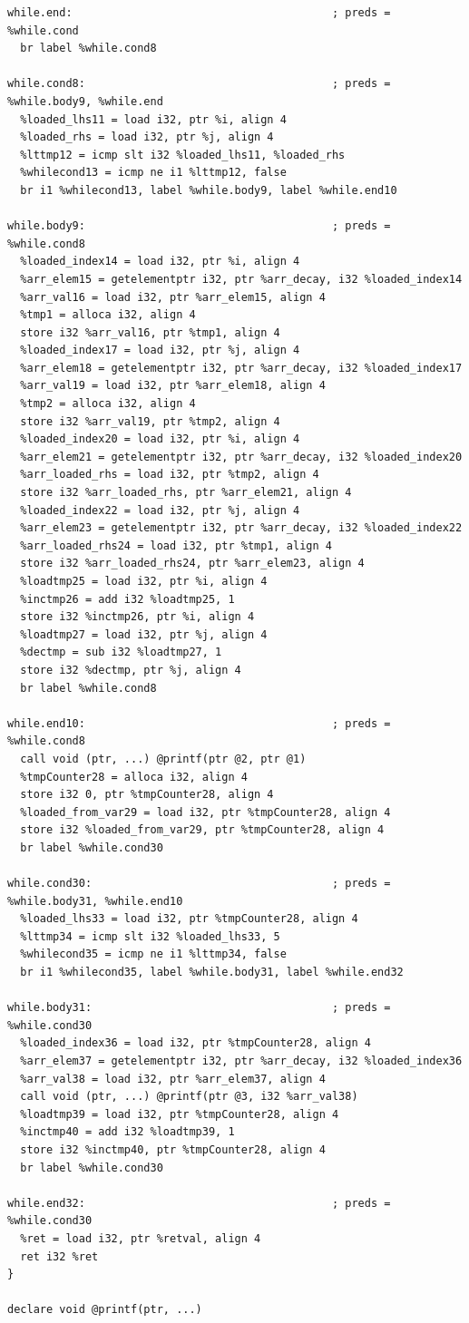 \begin{lstlisting}
while.end:                                        ; preds = %while.cond
  br label %while.cond8

while.cond8:                                      ; preds = %while.body9, %while.end
  %loaded_lhs11 = load i32, ptr %i, align 4
  %loaded_rhs = load i32, ptr %j, align 4
  %lttmp12 = icmp slt i32 %loaded_lhs11, %loaded_rhs
  %whilecond13 = icmp ne i1 %lttmp12, false
  br i1 %whilecond13, label %while.body9, label %while.end10

while.body9:                                      ; preds = %while.cond8
  %loaded_index14 = load i32, ptr %i, align 4
  %arr_elem15 = getelementptr i32, ptr %arr_decay, i32 %loaded_index14
  %arr_val16 = load i32, ptr %arr_elem15, align 4
  %tmp1 = alloca i32, align 4
  store i32 %arr_val16, ptr %tmp1, align 4
  %loaded_index17 = load i32, ptr %j, align 4
  %arr_elem18 = getelementptr i32, ptr %arr_decay, i32 %loaded_index17
  %arr_val19 = load i32, ptr %arr_elem18, align 4
  %tmp2 = alloca i32, align 4
  store i32 %arr_val19, ptr %tmp2, align 4
  %loaded_index20 = load i32, ptr %i, align 4
  %arr_elem21 = getelementptr i32, ptr %arr_decay, i32 %loaded_index20
  %arr_loaded_rhs = load i32, ptr %tmp2, align 4
  store i32 %arr_loaded_rhs, ptr %arr_elem21, align 4
  %loaded_index22 = load i32, ptr %j, align 4
  %arr_elem23 = getelementptr i32, ptr %arr_decay, i32 %loaded_index22
  %arr_loaded_rhs24 = load i32, ptr %tmp1, align 4
  store i32 %arr_loaded_rhs24, ptr %arr_elem23, align 4
  %loadtmp25 = load i32, ptr %i, align 4
  %inctmp26 = add i32 %loadtmp25, 1
  store i32 %inctmp26, ptr %i, align 4
  %loadtmp27 = load i32, ptr %j, align 4
  %dectmp = sub i32 %loadtmp27, 1
  store i32 %dectmp, ptr %j, align 4
  br label %while.cond8

while.end10:                                      ; preds = %while.cond8
  call void (ptr, ...) @printf(ptr @2, ptr @1)
  %tmpCounter28 = alloca i32, align 4
  store i32 0, ptr %tmpCounter28, align 4
  %loaded_from_var29 = load i32, ptr %tmpCounter28, align 4
  store i32 %loaded_from_var29, ptr %tmpCounter28, align 4
  br label %while.cond30

while.cond30:                                     ; preds = %while.body31, %while.end10
  %loaded_lhs33 = load i32, ptr %tmpCounter28, align 4
  %lttmp34 = icmp slt i32 %loaded_lhs33, 5
  %whilecond35 = icmp ne i1 %lttmp34, false
  br i1 %whilecond35, label %while.body31, label %while.end32

while.body31:                                     ; preds = %while.cond30
  %loaded_index36 = load i32, ptr %tmpCounter28, align 4
  %arr_elem37 = getelementptr i32, ptr %arr_decay, i32 %loaded_index36
  %arr_val38 = load i32, ptr %arr_elem37, align 4
  call void (ptr, ...) @printf(ptr @3, i32 %arr_val38)
  %loadtmp39 = load i32, ptr %tmpCounter28, align 4
  %inctmp40 = add i32 %loadtmp39, 1
  store i32 %inctmp40, ptr %tmpCounter28, align 4
  br label %while.cond30

while.end32:                                      ; preds = %while.cond30
  %ret = load i32, ptr %retval, align 4
  ret i32 %ret
}

declare void @printf(ptr, ...)

\end{lstlisting}
